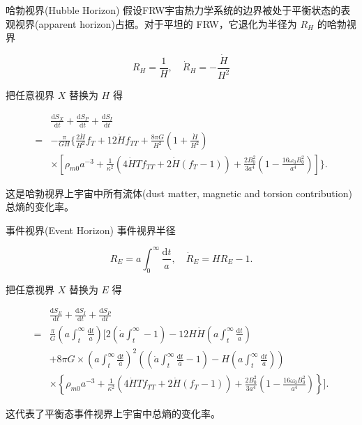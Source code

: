 \documentclass[9pt, dvipsnames]{beamer} %
\begin{document}
\begin{frame}{哈勃视界(Hubble Horizon)}
    假设FRW宇宙热力学系统的边界被处于平衡状态的表观视界(apparent horizon)占据。对于平坦的 FRW，它退化为半径为 $R_H$ 的哈勃视界

    $$
    R_H = \frac{1 }{H } ,\quad
    \dot{R}_H = -\frac{\dot{H} }{H^2 }
    $$

    把任意视界 $X$ 替换为 $H$ 得

    $$
    \begin{aligned}
        &\frac{\mathrm{d}S_X }{\mathrm{d}t } + \frac{\mathrm{d}S_P }{\mathrm{d}t } + \frac{\mathrm{d}S_I }{\mathrm{d}t } \\
        =&-\frac{\pi }{G H} \bigg\{\frac{2\dot{H} }{H^2 } f_T + 12\dot{H}f_{TT} +\frac{8\pi G }{H^2 }\left(1+\frac{\dot{H} }{H^2 }  \right) \\
        &\times \left[\rho_{m0}a^{-3} + \frac{1 }{\kappa^2 } \left(4\dot{H}T f_{TT} + 2\dot{H}\left(f_T-1 \right) \right) + \frac{2 B_0^2 }{3a^4 } \left(1-\frac{16\omega_0 B_0^2 }{a^4 }  \right) \right] \bigg\}.
        \end{aligned}
    $$

    这是哈勃视界上宇宙中所有流体(dust matter, magnetic and torsion contribution)总熵的变化率。
    
\end{frame}

\begin{frame}{事件视界(Event Horizon)}
    事件视界半径

    $$
    R_E = a\int_0^{\infty} \frac{\mathrm{d}t }{a } ,\quad
    \dot{R}_E = H R_E - 1.
    $$

    把任意视界 $X$ 替换为 $E$ 得

    $$
    \begin{aligned}
        &\frac{\mathrm{d}S_E}{\mathrm{d}t} + \frac{\mathrm{d}S_I}{\mathrm{d}t} + \frac{\mathrm{d}S_P}{\mathrm{d}t} \\
        =&\frac{\pi}{G} \left(a\int_t^\infty \frac{\mathrm{d}t}{a}\right)\bigg[2\left(\dot{a}\int_t^\infty -1 \right) - 12H\dot{H} \left(a\int_t^\infty \frac{\mathrm{d}t}{a}\right) \\
        &+8\pi G\times \left(a\int_t^\infty\frac{\mathrm{d}t}{a}\right)^2\left(\left(\dot{a}\int_t^\infty\frac{\mathrm{d}t}{a}-1\right)-H\left(a\int_t^\infty\frac{\mathrm{d}t}{a}\right)\right) \\
        &\times \left\{\rho_{m0}a^{-3} + \frac{1}{\kappa^2} \left(4\dot{H}T f_{TT} + 2\dot{H}(f_T-1)\right) + \frac{2B_0^2}{3a^4}\left(1-\frac{16\omega_0B_0^2}{a^4}\right) \right\} \bigg]. 
    \end{aligned}
    $$

    这代表了平衡态事件视界上宇宙中总熵的变化率。

\end{frame}
\end{document}
